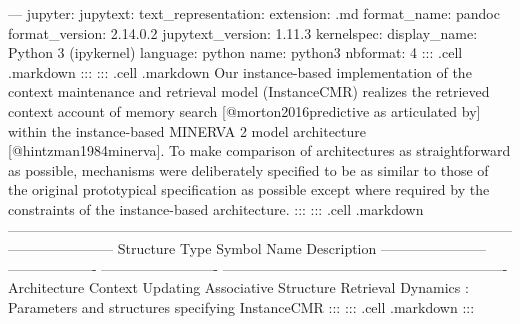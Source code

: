 --- jupyter: jupytext: text_representation: extension: .md format_name: pandoc format_version: 2.14.0.2 jupytext_version: 1.11.3 kernelspec: display_name: Python 3 (ipykernel) language: python name: python3 nbformat: 4\markdownRendererInterblockSeparator
{}\markdownRendererInterblockSeparator
{}::: {.cell .markdown}\markdownRendererInterblockSeparator
{}\markdownRendererInterblockSeparator
{}:::\markdownRendererInterblockSeparator
{}::: {.cell .markdown} Our instance-based implementation of the context maintenance and retrieval model (InstanceCMR) realizes the retrieved context account of memory search [@morton2016predictive as articulated by] within the instance-based MINERVA 2 model architecture [@hintzman1984minerva]. To make comparison of architectures as straightforward as possible, mechanisms were deliberately specified to be as similar to those of the original prototypical specification as possible except where required by the constraints of the instance-based architecture. :::\markdownRendererInterblockSeparator
{}::: {.cell .markdown} ----------------------------------------------------------------------------------------------------------------------------------- Structure Type Symbol Name Description ----------------------- ------------------- ------------------------- ------------------------------------------------------------- Architecture \markdownRendererInterblockSeparator
{}\markdownRendererInterblockSeparator
{}Context Updating \markdownRendererInterblockSeparator
{}\markdownRendererInterblockSeparator
{}Associative Structure \markdownRendererInterblockSeparator
{}\markdownRendererInterblockSeparator
{}Retrieval Dynamics \markdownRendererInterblockSeparator
{}\markdownRendererInterblockSeparator
{}\markdownRendererHorizontalRule{}\markdownRendererInterblockSeparator
{}: Parameters and structures specifying InstanceCMR :::\markdownRendererInterblockSeparator
{}::: {.cell .markdown}\markdownRendererInterblockSeparator
{}\markdownRendererInterblockSeparator
{}:::\markdownRendererInterblockSeparator
